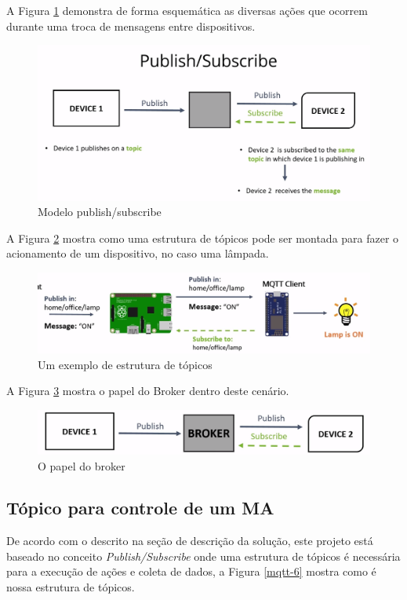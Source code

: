 A Figura \ref{mqtt-3} demonstra de forma esquemática as diversas ações que ocorrem durante uma troca de mensagens entre dispositivos.

\begin{figure}[H]
\caption{\label{mqtt-3} Modelo publish/subscribe}
\includegraphics[scale=0.25]{img/mqtt-3.png}
\end{figure}

A Figura \ref{mqtt-4} mostra como uma estrutura de tópicos pode ser montada para fazer o acionamento de um dispositivo, no caso uma lâmpada.

\begin{figure}[H]
\caption{\label{mqtt-4} Um exemplo de estrutura de tópicos}
\includegraphics[scale=0.3]{img/mqtt-5.png}
\end{figure}

A Figura \ref{mqtt-5} mostra o papel do Broker dentro deste cenário.

\begin{figure}[H]
\caption{\label{mqtt-5} O papel do broker}
\includegraphics[scale=0.25]{img/mqtt-4.png}
\end{figure}

\subsection{Tópico para controle de um MA}
De acordo com o descrito na seção de descrição da solução, este projeto está baseado no conceito \textit{Publish/Subscribe} onde uma estrutura de tópicos é necessária para a execução de ações e coleta de dados, a Figura \ref{mqtt-6} mostra como é nossa estrutura de tópicos.

